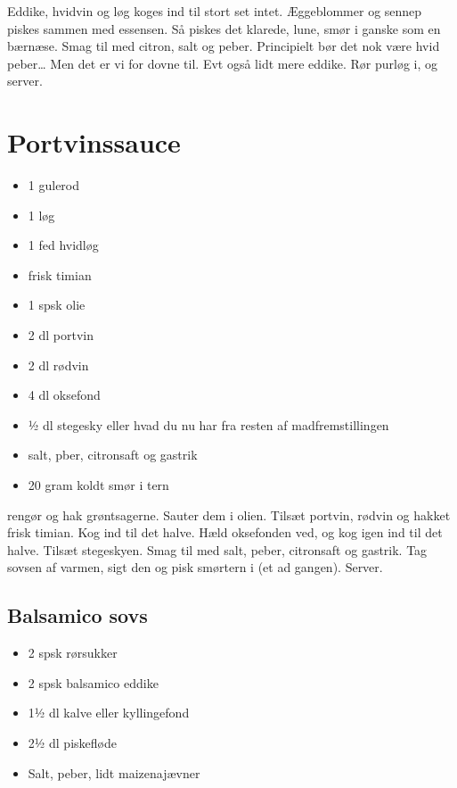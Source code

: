 \documentclass[
]{book}
\providecommand{\tightlist}{%
  \setlength{\itemsep}{0pt}\setlength{\parskip}{0pt}}
\begin{document}
Eddike, hvidvin og løg koges ind til stort set intet.
Æggeblommer og sennep piskes sammen med essensen. Så piskes det klarede,
lune, smør i ganske som en bærnæse. Smag til med citron, salt og peber.
Principielt bør det nok være hvid peber\ldots{} Men det er vi for dovne til.
Evt også lidt mere eddike.
Rør purløg i, og server.

\section{Portvinssauce}\label{portvinssauce}

\begin{itemize}
\tightlist
\item
  1 gulerod
\item
  1 løg
\item
  1 fed hvidløg
\item
  frisk timian
\item
  1 spsk olie
\item
  2 dl portvin
\item
  2 dl rødvin
\item
  4 dl oksefond
\item
  ½ dl stegesky eller hvad du nu har fra resten af madfremstillingen
\item
  salt, pber, citronsaft og gastrik
\item
  20 gram koldt smør i tern
\end{itemize}

rengør og hak grøntsagerne.
Sauter dem i olien.
Tilsæt portvin, rødvin og hakket frisk timian. Kog ind til det halve.
Hæld oksefonden ved, og kog igen ind til det halve. Tilsæt stegeskyen.
Smag til med salt, peber, citronsaft og gastrik.
Tag sovsen af varmen, sigt den og pisk smørtern i (et ad gangen). Server.

\subsection{Balsamico sovs}\label{balsamico-sovs}

\begin{itemize}
\tightlist
\item
  2 spsk rørsukker
\item
  2 spsk balsamico eddike
\item
  1½ dl kalve eller kyllingefond
\item
  2½ dl piskefløde
\item
  Salt, peber, lidt maizenajævner
\end{itemize}
\end{document}
